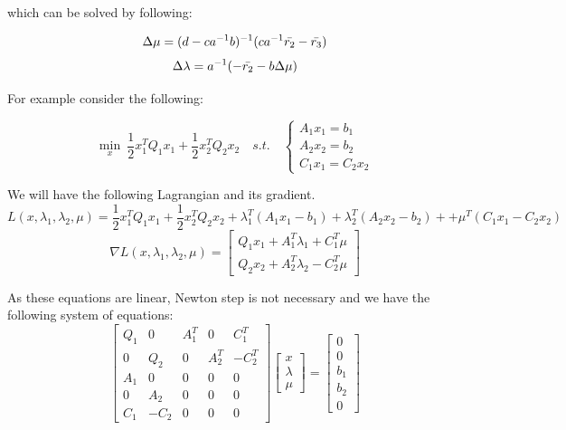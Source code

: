 which can be solved by following:

\[
\Delta \mu = (d - ca^{-1} b)^{-1} (c a^{-1} \Bar{r_2} - \Bar{r_3})
\]    
\[
\Delta \lambda = a^{-1} (- \Bar{r_2} - b \Delta \mu)
\]

For example consider the following:

    \[
        \min_x \: \frac{1}{2} x_1^T Q_1 x_1 + \frac{1}{2} x_2^T Q_2 x_2  \quad s.t. \quad
        \begin{cases} A_1 x_1 = b_1\\
        A_2 x_2 = b_2\\
        C_1 x_1 = C_2 x_2
        \end{cases}
    \]

We will have the following Lagrangian and its gradient.
\[
L(x,\lambda_1,\lambda_2,\mu) = \frac{1}{2} x_1^T Q_1 x_1 + \frac{1}{2} x_2^T Q_2 x_2 + \lambda_1^T (A_1 x_1 - b_1) +
\lambda_2^T (A_2 x_2 - b_2) + + \mu^T (C_1 x_1 - C_2 x_2)
\]
\[
\nabla L(x,\lambda_1,\lambda_2,\mu) = \begin{bmatrix}
    Q_1 x_1 + A_1^T \lambda_1 + C_1^T \mu \\
    Q_2 x_2 + A_2^T \lambda_2 - C_2^T \mu
\end{bmatrix}
\]

As these equations are linear, Newton step is not necessary and we have the following system of equations:
\[
\begin{bmatrix}
    Q_1 & 0 & A_1^T & 0 & C_1^T \\
    0 & Q_2 & 0 & A_2^T & -C_2^T \\
    A_1 & 0 & 0 & 0 & 0 \\
    0 & A_2 & 0 & 0 & 0 \\
    C_1 & -C_2 & 0 & 0 & 0
\end{bmatrix}
\begin{bmatrix}
    x \\
    \lambda \\
    \mu
\end{bmatrix} = 
\begin{bmatrix}
    0 \\
    0 \\
    b_1 \\
    b_2 \\
    0
\end{bmatrix}
\]

